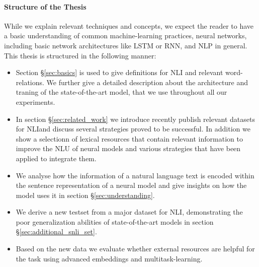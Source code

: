 \paragraph*{Structure of the Thesis}
While we explain relevant techniques and concepts, we expect the reader to have a basic understanding of common machine-learning practices, neural networks, including basic network architectures like \ac{LSTM} or \ac{RNN}, and \ac{NLP} in general. This thesis is structured in the following manner:
\begin{itemize}
\item Section §\ref{sec:basics} is used to give definitions for \ac{NLI} and relevant word-relations. We further give a detailed description about the architecture and traning of the state-of-the-art model, that we use throughout all our experiments.
\item In section §\ref{sec:related_work} we introduce recently publish relevant datasets for \ac{NLI}and discuss several strategies proved to be successful. In addition we show a selectionn of lexical resources that contain relevant information to improve the \ac{NLU} of neural models and various strategies that have been applied to integrate them.
\item We analyse how the information of a natural language text is encoded within the sentence representation of a neural model and give insights on how the model uses it in section §\ref{sec:understanding}.
\item We derive a new testset from a major dataset for \ac{NLI}, demonstrating the poor generalization abilities of state-of-the-art models in section §\ref{sec:additional_snli_set}.
\item Based on the new data we evaluate whether external resources are helpful for the task using advanced embeddings and multitask-learning.
\end{itemize}